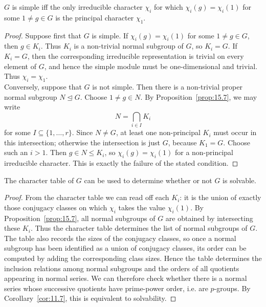 \documentclass[../Odyssey_Project.tex]{subfiles}
\begin{document}
\begin{corollary}
\label{cor:15.8}
$G$ is simple iff the only irreducible character $\chi_i$ for which $\chi_i(g) = \chi_i(1)$ for some $1 \neq g \in G$ is the principal character $\chi_1$.
\end{corollary}
\begin{proof}
    Suppose first that $G$ is simple. If $\chi_i(g)=\chi_i(1)$ for some $1\neq g\in G$, then $g\in K_i$. Thus $K_i$ is a non-trivial normal subgroup of $G$, so $K_i=G$. If $K_i=G$, then the corresponding irreducible representation is trivial on every element of $G$, and hence the simple module must be one-dimensional and trivial. Thus $\chi_i=\chi_1$.\\
    Conversely, suppose that $G$ is not simple. Then there is a non-trivial proper normal subgroup $N \trianglelefteq G$. Choose $1\neq g\in N$. By Proposition~\ref{prop:15.7}, we may write
    \[
        N=\bigcap_{i\in I}K_i
    \]
    for some $I\subseteq\{1,\ldots,r\}$. Since $N\neq G$, at least one non-principal $K_i$ must occur in this intersection; otherwise the intersection is just $G$, because $K_1=G$. Choose such an $i>1$. Then $g\in N\leq K_i$, so $\chi_i(g)=\chi_i(1)$ for a non-principal irreducible character. This is exactly the failure of the stated condition.
\end{proof}

\begin{corollary}
\label{cor:15.9}
The character table of $G$ can be used to determine whether or not $G$ is solvable.
\end{corollary}
\begin{proof}
    From the character table we can read off each $K_i$: it is the union of exactly those conjugacy classes on which $\chi_i$ takes the value $\chi_i(1)$. By Proposition~\ref{prop:15.7}, all normal subgroups of $G$ are obtained by intersecting these $K_i$. Thus the character table determines the list of normal subgroups of $G$.\\
    The table also records the sizes of the conjugacy classes, so once a normal subgroup has been identified as a union of conjugacy classes, its order can be computed by adding the corresponding class sizes. Hence the table determines the inclusion relations among normal subgroups and the orders of all quotients appearing in normal series. We can therefore check whether there is a normal series whose successive quotients have prime-power order, i.e. are $p$-groups. By Corollary~\ref{cor:11.7}, this is equivalent to solvability.
\end{proof}
\end{document}

